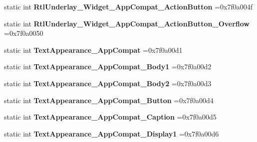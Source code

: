\begin{DoxyCompactItemize}
\item 
\mbox{\label{classandroid_1_1support_1_1v4_1_1R_1_1style_a7714bc3d9fc14557c0d7f0f4c6d7a6ec}} 
static int {\bfseries Rtl\+Underlay\+\_\+\+Widget\+\_\+\+App\+Compat\+\_\+\+Action\+Button} =0x7f0a004f
\item 
\mbox{\label{classandroid_1_1support_1_1v4_1_1R_1_1style_a857a0d28f4739cdcc499892ebf9a3cd0}} 
static int {\bfseries Rtl\+Underlay\+\_\+\+Widget\+\_\+\+App\+Compat\+\_\+\+Action\+Button\+\_\+\+Overflow} =0x7f0a0050
\item 
\mbox{\label{classandroid_1_1support_1_1v4_1_1R_1_1style_aa6797b54a750a05cb14356c4abd98fef}} 
static int {\bfseries Text\+Appearance\+\_\+\+App\+Compat} =0x7f0a00d1
\item 
\mbox{\label{classandroid_1_1support_1_1v4_1_1R_1_1style_a113f2a53a828b469a4773ec81ff98fe5}} 
static int {\bfseries Text\+Appearance\+\_\+\+App\+Compat\+\_\+\+Body1} =0x7f0a00d2
\item 
\mbox{\label{classandroid_1_1support_1_1v4_1_1R_1_1style_a531a9e9c9d80de6280fe7aec85a733c6}} 
static int {\bfseries Text\+Appearance\+\_\+\+App\+Compat\+\_\+\+Body2} =0x7f0a00d3
\item 
\mbox{\label{classandroid_1_1support_1_1v4_1_1R_1_1style_ad2e05db80871b4e7ea538b1435b1a42a}} 
static int {\bfseries Text\+Appearance\+\_\+\+App\+Compat\+\_\+\+Button} =0x7f0a00d4
\item 
\mbox{\label{classandroid_1_1support_1_1v4_1_1R_1_1style_a67053be2a0d4e45906419c64ee7f23c2}} 
static int {\bfseries Text\+Appearance\+\_\+\+App\+Compat\+\_\+\+Caption} =0x7f0a00d5
\item 
\mbox{\label{classandroid_1_1support_1_1v4_1_1R_1_1style_ac48ff81b89987c193245d44ca3ec00ec}} 
static int {\bfseries Text\+Appearance\+\_\+\+App\+Compat\+\_\+\+Display1} =0x7f0a00d6
\item 

\end{DoxyCompactItemize}
